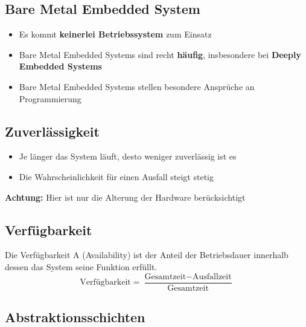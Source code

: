 \subsection{Bare Metal Embedded System}

\begin{itemize}
    \item Es kommt \textbf{keinerlei Betriebssystem} zum Einsatz
    \item Bare Metal Embedded Systems sind recht \textbf{häufig}, insbesondere bei \textbf{Deeply Embedded Systems}
    \item Bare Metal Embedded Systems stellen besondere Ansprüche an Programmierung
\end{itemize}


\subsection{Zuverlässigkeit}

\begin{minipage}[c]{0.45\columnwidth}
    
\end{minipage}
\hfill
\begin{minipage}[c]{0.5\columnwidth}
    \raggedright

    \begin{itemize}
        \item Je länger das System läuft, desto weniger zuverlässig ist es
        \item Die Wahrscheinlichkeit für einen Ausfall steigt stetig
    \end{itemize}
    
    \vspace{0.2cm}

    \textbf{Achtung:} Hier ist nur die Alterung der Hardware berücksichtigt
\end{minipage}


\subsection{Verfügbarkeit}

Die Verfügbarkeit A (Availability) ist der Anteil der Betriebsdauer innerhalb dessen das System seine Funktion erfüllt.
$$ \text{Verfügbarkeit} = \frac{\text{Gesamtzeit} - \text{Ausfallzeit}}{\text{Gesamtzeit}} $$


\subsection{Abstraktionsschichten}
\label{Abstraktionsschichten}

